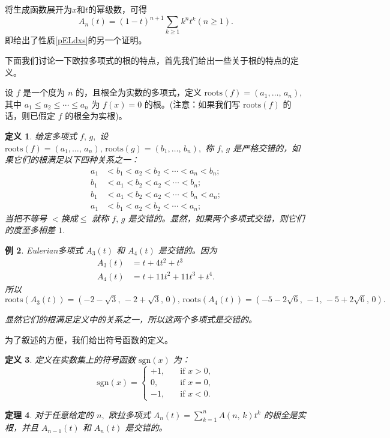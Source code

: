 \documentclass[a4paper,11pt,twoside]{book}
\newtheorem{thm}{定理}[section]
\newtheorem{defi}[thm]{定义}
\newtheorem{exa}[thm]{例}
\def \roots{\mathrm{roots}}
\def \sgn{\mathrm{sgn}}
\begin{document}
将生成函数展开为$x$和$t$的幂级数，可得
\begin{equation}\label{Ant}
A_n(t)=(1-t)^{n+1}\sum_{k\geq1}k^nt^k (n\geq1).
\end{equation}
即给出了性质\ref{pELdxs}的另一个证明。




下面我们讨论一下欧拉多项式的根的特点，首先我们给出一些关于根的特点的定义。

设 $f$ 是一个度为 $n$ 的，且根全为实数的多项式，定义
$\mathrm{roots}(f)=\left(a_{1},\ldots,\,a_{n}\right),$ 其中
$a_{1}\leqslant a_{2}\leqslant \cdots \leqslant a_{n}$ 为 $f(x)=0$
的根。(注意：如果我们写 $\mathrm{roots}(f)$ 的话，则已假定 $f$
的根全为实根)。

 \begin{defi} 给定多项式 $f,\,g,$
设 $\mathrm{roots}(f)=\left(a_{1},\ldots,\,a_{n}\right),\,
\mathrm{roots}(g)=\left(b_{1},\ldots,\, b_{n}\right),$ 称 $f,\,g$
是严格交错的，如果它们的根满足以下四种关系之一：
\begin{align*}
 a_{1}&<b_{1}<a_{2}<b_{2}< \cdots <a_{n}<b_{n};\\[5pt]
 b_{1}&<a_{1}<b_{2}< a_{2}< \cdots <b_{n};\\[5pt]
 b_{1}&<a_{1}<b_{2}<a_{2}< \cdots <b_{n}<a_{n};\\[5pt]
 a_{1}&<b_{1}<a_{2}< b_{2}< \cdots <a_{n};
\end{align*}
当把不等号 $<$换成$\leq$ 就称 $f,\,g$
是交错的。显然，如果两个多项式交错，则它们的度至多相差 $1$.
\end{defi}

\begin{exa}
Eulerian多项式 $A_{3}(t)$ 和 $A_{4}(t)$ 是交错的。因为
\begin{align*}
A_3(t) &=t+4t^2+t^3 \\
A_4(t) &=t+11t^2+11t^3+t^4.
\end{align*}
所以$\roots\left(A_{3}(t)\right)=\left(-2-\sqrt{3},\,-2+\sqrt{3},\,0\right),\,
\roots\left(A_{4}(t)\right)=\left(-5-2\sqrt{6},\,-1,\,-5+2\sqrt{6},\,0\right).$

显然它们的根满足定义中的关系之一，所以这两个多项式是交错的。
\end{exa}
为了叙述的方便，我们给出符号函数的定义。
 \begin{defi}
定义在实数集上的符号函数 $\sgn(x)$ 为：
$$ \sgn(x)=\left\{ \begin{array}{ll}
+1, \quad &\textrm{if $x>0,$}\\[5pt]
0 , \quad &\textrm{if $x=0,$}\\[5pt]
-1,  \quad &\textrm{if $x<0.$}
\end{array}\right.
$$
 \end{defi}
 \begin{thm}
对于任意给定的 $n,$ 欧拉多项式 $A_{n}(t)=\sum
_{k=1}^{n}A(n,\,k)t^{k}$ 的根全是实根，并且 $A_{n-1}(t)$ 和
$A_{n}(t)$ 是交错的。
\end{thm}
\end{document}
